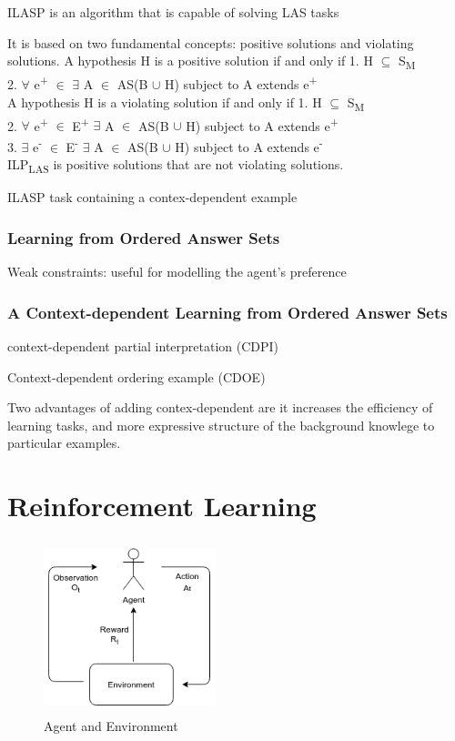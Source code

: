 \documentclass[12pt,twoside]{report}
\begin{document}
ILASP is an algorithm that is capable of solving LAS tasks

It is based on two fundamental concepts: positive solutions and violating solutions.
A hypothesis H is a positive solution if and only if
1. H $\subseteq$ S\textsubscript{M} \\
2. $\forall$ e\textsuperscript{+} $\in$ $\exists$ A $\in$ AS(B $\cup$ H) subject to A extends e\textsuperscript{+}\\

A hypothesis H is a violating solution if and only if
1. H $\subseteq$ S\textsubscript{M} \\
2. $\forall$ e\textsuperscript{+} $\in$ E\textsuperscript{+} $\exists$ A $\in$ AS(B $\cup$ H) subject to A extends e\textsuperscript{+}\\
3. $\exists$ e\textsuperscript{-} $\in$ E\textsuperscript{-} $\exists$ A $\in$ AS(B $\cup$ H) subject to A extends e\textsuperscript{-}\\


ILP\textsubscript{LAS} is positive solutions that are not violating solutions.

ILASP task containing a contex-dependent example

\subsubsection{Learning from Ordered Answer Sets}

Weak constraints: useful for modelling the agent's preference



\subsubsection{A Context-dependent Learning from Ordered Answer Sets}


context-dependent partial interpretation (CDPI)


Context-dependent ordering example (CDOE)

Two advantages of adding contex-dependent are it increases the efficiency of learning tasks, and more expressive structure of the background knowlege to particular examples.


\section{Reinforcement Learning}
\label{rl}

\begin{figure}[!htb]
\centering
\includegraphics[width=5cm, height=5cm]{./figures/agent_env}
\caption{Agent and Environment}
\label{agent_env}
\end{figure}
\end{document}
